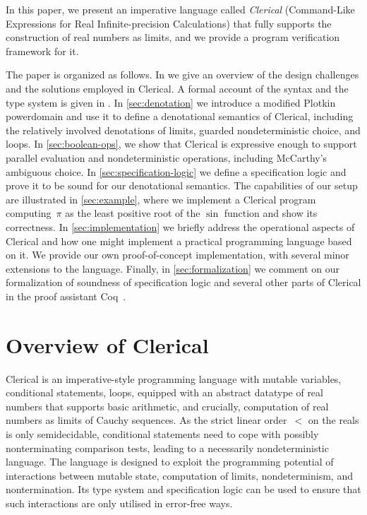 In this paper, we present an imperative language called 
\emph{Clerical} (Command-Like Expressions for Real Infinite-precision Calculations)  that
fully supports the construction of real numbers as limits, and we provide a program verification framework for it.

The paper is organized as follows.
%
In  we give an overview of the design challenges and the solutions employed in Clerical.
A formal account of the syntax and the type system is given in .
%
In \cref{sec:denotation} we introduce a modified Plotkin powerdomain and use it to define a denotational semantics of Clerical, including the relatively involved denotations of limits, guarded nondeterministic choice, and loops.
%
In \cref{sec:boolean-ops}, we show that Clerical is expressive enough to support parallel evaluation and nondeterministic operations, including McCarthy's ambiguous choice.
%
In \cref{sec:specification-logic} we define a specification logic and prove it to be sound for our denotational semantics.
The capabilities of our setup are illustrated in \cref{sec:example}, where we implement a Clerical program computing~$\pi$ as the least positive root of the $\sin$ function and show its correctness.
%
In \cref{sec:implementation} we briefly address the operational aspects of Clerical and how one might implement a practical programming language based on it. We provide our own proof-of-concept implementation, with several minor extensions to the language.
%
Finally, in \cref{sec:formalization} we comment on our formalization of soundness of specification logic and several other parts of Clerical in the proof assistant Coq~\cite{coq}.



\section{Overview of Clerical}
\label{sec:overview}

Clerical is an imperative-style programming language with mutable variables, conditional statements, loops, equipped with an abstract datatype of real numbers that supports basic arithmetic, and crucially, computation of real numbers as limits of Cauchy sequences. As the strict linear order~$<$ on the reals is only semidecidable, conditional statements need to cope with possibly nonterminating comparison tests, leading to a necessarily nondeterministic language.  
%
The language is designed to exploit the programming potential of interactions between mutable state, computation of limits, nondeterminism, and nontermination. Its type system and specification logic can be used to ensure that such interactions are only utilised in error-free ways.

